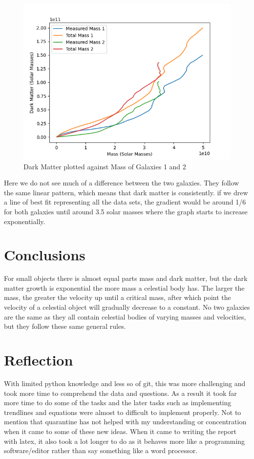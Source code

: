 \documentclass[10pt, twocolumn, twoside]{article}
\begin{document}
\begin{figure}[ht]
\includegraphics[width=\columnwidth]{graph8.png}
\caption[width=\columnwidth]{Dark Matter plotted against Mass of Galaxies 1 and 2}
\end{figure}

Here we do not see much of a difference between the two galaxies. They follow the same linear pattern, which means that dark matter is consistently. if we drew a line of best fit representing all the data sets, the gradient would be around 1/6 for both galaxies until around 3.5 solar masses where the graph starts to increase exponentially.

\newpage

\section{Conclusions}

For small objects there is almost equal parts mass and dark matter, but the dark matter growth is exponential the more mass a celestial body has. The larger the mass, the greater the velocity up until a critical mass, after which point the velocity of a celestial object will gradually decrease to a constant. No two galaxies are the same as they all contain celestial bodies of varying masses and velocities, but they follow these same general rules.

\section{Reflection}
With limited python knowledge and less so of git, this was more challenging and took more time to comprehend the data and questions. As a result it took far more time to do some of the tasks and the later tasks such as implementing trendlines and equations were almost to difficult to implement properly. Not to mention that quarantine has not helped with my understanding or concentration when it came to some of these new ideas. When it came to writing the report with latex, it also took a lot longer to do as it behaves more like a programming software/editor rather than say something like a word processor.
\end{document}
